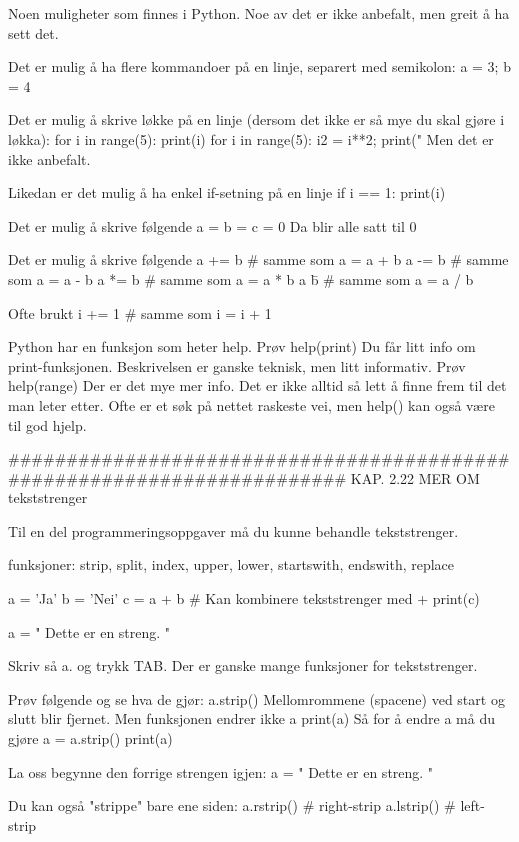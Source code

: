 Noen muligheter som finnes i Python. 
Noe av det er ikke anbefalt, men greit å ha sett det. 


Det er mulig å ha flere kommandoer på en linje, separert med semikolon:
a = 3; b = 4


Det er mulig å skrive løkke på en linje 
(dersom det ikke er så mye du skal gjøre i løkka):
for i in range(5): print(i)
for i in range(5): i2 = i**2; print("%
Men det er ikke anbefalt. 

Likedan er det mulig å ha enkel if-setning på en linje 
if i == 1: print(i)


Det er mulig å skrive følgende
a = b = c = 0
Da blir alle satt til 0


Det er mulig å skrive følgende
a += b    # samme som a = a + b
a -= b    # samme som a = a - b
a *= b    # samme som a = a * b
a \= b    # samme som a = a / b

Ofte brukt 
i += 1    # samme som i = i + 1



Python har en funksjon som heter help.
Prøv
help(print)
Du får litt info om print-funksjonen.
Beskrivelsen er ganske teknisk, men litt informativ.
Prøv
help(range)
Der er det mye mer info. 
Det er ikke alltid så lett å finne frem til det man leter etter.
Ofte er et søk på nettet raskeste vei, men help() kan også være til god hjelp. 

######################################################################## 
KAP. 2.22  MER OM tekststrenger

Til en del programmeringsoppgaver må du kunne behandle tekststrenger.

funksjoner: strip, split, index, upper, lower, startswith, endswith, replace

a = 'Ja'
b = 'Nei'
c = a + b    # Kan kombinere tekststrenger med +
print(c)

a = " Dette er en streng.  "

Skriv så a. og trykk TAB. Der er ganske mange funksjoner for tekststrenger.

Prøv følgende og se hva de gjør: 
a.strip()
Mellomrommene (spacene) ved start og slutt blir fjernet.
Men funksjonen endrer ikke a
print(a)
Så for å endre a må du gjøre 
a = a.strip() 
print(a)


La oss begynne den forrige strengen igjen: 
a = " Dette er en streng.  "

Du kan også "strippe" bare ene siden:
a.rstrip()    # right-strip
a.lstrip()    # left-strip


